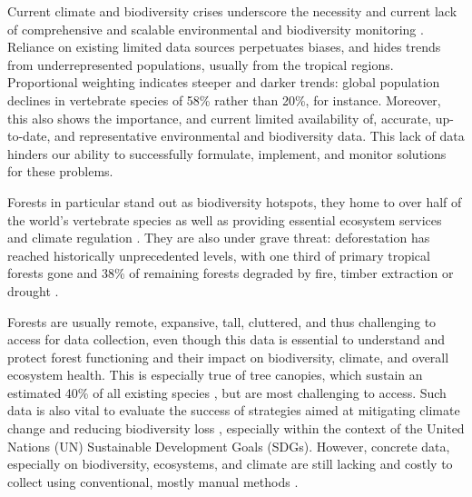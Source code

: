 
Current climate and biodiversity crises \cite{Pereira2024, Weiskopf2024, Pimm2014, Portner2023} underscore the necessity and current lack of comprehensive and scalable environmental and biodiversity monitoring \cite{Gonzalez2023a, McRae2017, Gonzalez2016, Mora2011}. 
Reliance on existing limited data sources perpetuates biases, and hides trends from underrepresented populations, usually from the tropical regions. Proportional weighting indicates steeper and darker trends: global population declines in vertebrate species of 58\% rather than 20\%, for instance\cite{McRae2017}. Moreover, this also shows the importance, and current limited availability of, accurate, up-to-date, and representative environmental and biodiversity data. This lack of data hinders our ability to successfully  formulate, implement, and monitor solutions for these problems. 





Forests in particular stand out as biodiversity hotspots, they home to over half of the world's vertebrate species \cite{Pillay2022} as well as providing essential ecosystem services and climate regulation \cite{Brockerhoff2017}. They are also under grave threat: deforestation has reached historically unprecedented levels, with one third of primary tropical forests gone \cite{Krogh2021} and 38\% of remaining forests degraded by fire, timber extraction or drought \cite{Lapola2023}.

Forests are usually remote, expansive, tall, cluttered, and thus challenging to access for data collection, even though this data is essential to understand and protect forest functioning and their impact on biodiversity, climate, and overall ecosystem health. This is especially true of tree canopies, which sustain an estimated 40\% of all existing species \cite{Ozanne2003d}, but are most challenging to access. Such data is also vital to evaluate the success of strategies aimed at mitigating climate change and reducing biodiversity loss \cite{Gonzalez2023}, especially within the context of the United Nations (UN) Sustainable Development Goals (SDGs). However, concrete data, especially on biodiversity, ecosystems, and climate are still lacking \cite{Goessmann2023} and costly to collect using conventional, mostly manual methods \cite{Cannon2021, UNEnvironment2019}. 

